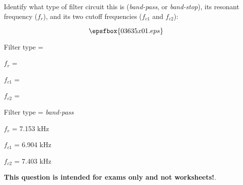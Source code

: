 

Identify what type of filter circuit this is ({\it band-pass}, or {\it band-stop}), its resonant frequency ($f_r$), and its two cutoff frequencies ($f_{c1}$ and $f_{c2}$):

$$\epsfbox{03635x01.eps}$$

Filter type =

\vskip 10pt

$f_r$ = 

\vskip 10pt

$f_{c1}$ =

\vskip 10pt

$f_{c2}$ = 







Filter type = {\it band-pass}

\vskip 10pt

$f_r$ = 7.153 kHz

\vskip 10pt

$f_{c1}$ = 6.904 kHz

\vskip 10pt

$f_{c2}$ = 7.403 kHz







{\bf This question is intended for exams only and not worksheets!}.



